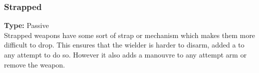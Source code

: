 \subsubsection{Strapped}
\label{iqty:strapped}
\textbf{Type:} Passive\\
Strapped weapons have some sort of strap or mechanism which makes them more difficult to drop.
This ensures that the wielder is harder to disarm, added a \threat to any attempt to do so.
However it also adds a manouvre to any attempt arm or remove the weapon.

